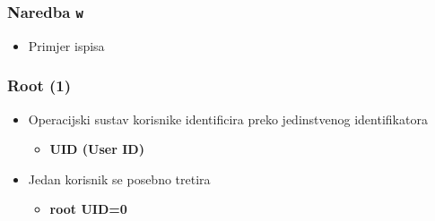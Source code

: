 \documentclass[table,usenames,dvipsnames] {beamer}
\newcommand{\shell}[1]{\texttt{#1}}
\begin{document}
\begin{frame}[t]
\frametitle{Naredba \shell{w}}
\begin{itemize}
  \item Primjer ispisa
    \begin{table}[h]\footnotesize
    \end{table}
\end{itemize}
\end{frame}

\begin{frame}[t]
\frametitle{Root (1)} 
\begin{itemize}
  \item Operacijski sustav korisnike identificira preko jedinstvenog identifikatora
  \begin{itemize}
	  \item[] \textbf{UID (User ID)}
  \end{itemize}
\end{itemize}
\begin{itemize}
  \item Jedan korisnik se posebno tretira 
  \begin{itemize}
    \item[] \bf{root} \hspace{2em} UID=0
  \end{itemize}
\end{itemize}
\end{frame}
\end{document}
